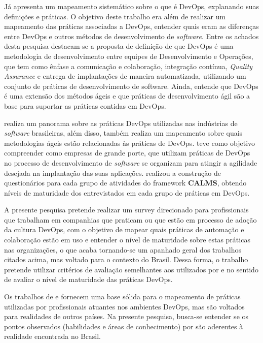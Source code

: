 \documentclass[twoside,english,brazilian]{UNISINOSartigo}
\begin{document}
Já  apresenta um mapeamento sistemático sobre o que é DevOps, explanando suas definições e práticas. O objetivo deste trabalho era além de realizar um mapeamento das práticas associadas a DevOps, entender quais eram as diferenças entre DevOps e outros métodos de desenvolvimento de \textit{software}. Entre os achados desta pesquisa destacam-se a proposta de definição de que DevOps é uma metodologia de desenvolvimento entre equipes de Desenvolvimento e Operações, que tem como ênfase a comunicação e colaboração, integração contínua, \textit{Quality Assurance} e entrega de implantações de maneira automatizada, utilizando um conjunto de práticas de desenvolvimento de software. Ainda, entende que DevOps é uma extensão dos métodos ágeis e que práticas de desenvolvimento ágil são a base para suportar as práticas contidas em DevOps. 

 realiza um panorama sobre as práticas DevOps utilizadas nas indústrias de \textit{software} brasileiras, além disso, também realiza um mapeamento sobre quais metodologias ágeis estão relacionadas às práticas de DevOps. 
 teve como objetivo compreender como empresas de grande porte, que utilizam práticas de DevOps no processo de desenvolvimento de \textit{software} se organizam para atingir a agilidade desejada na implantação das suas aplicações.  realizou a construção de questionários para cada grupo de atividades do framework \textbf{CALMS}, obtendo níveis de maturidade dos entrevistados em cada grupo de práticas em DevOps.

A presente pesquisa pretende realizar um survey direcionado para profissionais que trabalham em companhias que praticam ou que estão em processo de adoção da cultura DevOps, com o objetivo de mapear quais práticas de automação e colaboração estão em uso e entender o nível de maturidade sobre estas práticas nas organizações, o que acaba tornando-se um apanhado geral dos trabalhos citados acima, mas voltado para o contexto do Brasil.
Dessa forma, o trabalho pretende utilizar critérios de avaliação semelhantes aos utilizados por  e  no sentido de avaliar o nível de maturidade das práticas DevOps.

Os trabalhos de  e  fornecem uma base sólida para o mapeamento de práticas utilizadas por profissionais atuantes nos ambientes DevOps, mas são voltados para realidades de outros países. Na presente pesquisa, busca-se entender se os pontos observados (habilidades e áreas de conhecimento) por  são aderentes à realidade encontrada no Brasil.
\end{document}
